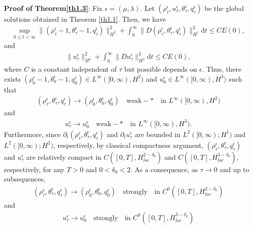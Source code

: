 \documentclass[11pt,reqno]{amsart}
\numberwithin{equation}{section}
\newcommand{\dif}{\mathrm{d}}
\begin{document}
{\bf Proof of Theorem\ref{th1.3}}: Fix $\epsilon=(\mu, \lambda)$. Let  $(\rho_\tau^\epsilon, u_\tau^\epsilon, \theta_\tau^\epsilon, q_\tau^\epsilon)$ be the global solutions obtained in Theorem \ref{th1.1}.  Then, we have
\begin{align} \label{4.4}
\sup_{0\le t <\infty} \|(\rho_\tau^\epsilon-1, \theta_\tau^\epsilon-1, q_\tau^\epsilon)\|_{H^2}^2+\int_0^\infty \| D(\rho_\tau^\epsilon,  \theta_\tau^\epsilon, q_\tau^\epsilon)\|_{H^1}^2 \dif t \le C E(0),
\end{align}
and
\begin{align}\label{4.4-1}
\| u_\tau^\epsilon\|_{H^3}^2+\int_0^\infty  \|D u_\tau^\epsilon\|_{H^2}^2 \dif t \le C E(0),
\end{align}
where $C$ is a constant independent of $\tau$ but possible depends on $\epsilon$.
Thus, there exists $(\rho_0^\epsilon-1, \theta_0^\epsilon-1, q_0^\epsilon)\in L^\infty([0, \infty), H^2)$ and $u_0^\epsilon \in L^\infty([0, \infty), H^3)$ such that
\begin{align*}
(\rho_\tau^\epsilon,  \theta_\tau^\epsilon, q_\tau^\epsilon) \rightarrow  (\rho_0^\epsilon,  \theta_0^\epsilon, q_0^\epsilon) \quad \text{weak}-\ast \quad \mbox{in } L^\infty([0, \infty), H^2)
\end{align*}
and
\begin{align*}
 u_\tau^\epsilon  \rightarrow    u_0^\epsilon  \quad \text{weak}-\ast \quad \mbox{in } L^\infty([0, \infty), H^3).
\end{align*}
Furthermore, since $ \partial_t ( \rho_\tau^\epsilon, \theta_\tau^\epsilon, q_\tau^\epsilon) $  and $\partial_t u_\tau^\epsilon$  are bounded in $L^2([0,\infty); H^1)$ and $L^2([0,\infty); H^2)$, respectively, by classical compactness argument, $(\rho_\tau^\epsilon,  \theta_\tau^\epsilon, q_\tau^\epsilon)$ and $u_\tau^\epsilon$ are relatively compact in $C([0, T], H_{loc}^{2-\delta_0})$ and $C([0, T], H_{loc}^{3-\delta_0})$, respectively,   for any $T>0$ and $0<\delta_0<2$. As a consequence, as $\tau \rightarrow 0$ and up to subsequences,
\begin{align*}
(\rho_\tau^\epsilon, \theta_\tau^\epsilon, q_\tau^\epsilon) \rightarrow  (\rho_0^\epsilon,  \theta_0^\epsilon, q_0^\epsilon) \quad \text{strongly} \quad \mbox{in } C^0([0, T], H_{loc}^{2-\delta_0})
\end{align*}
and
\begin{align*}
  u_\tau^\epsilon \rightarrow  u_0^\epsilon  \quad \text{strongly} \quad \mbox{in } C^0([0, T], H_{loc}^{3-\delta_0})
\end{align*}
\end{document}
